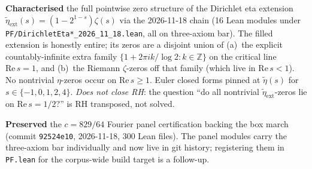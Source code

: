 
\item \textbf{Characterised} the full pointwise zero structure of
the Dirichlet eta extension
$\widetilde{\eta}_{\mathrm{ext}}(s) = (1 - 2^{1-s}) \zeta(s)$ via
the 2026-11-18 chain (16 Lean modules under
\texttt{PF/DirichletEta*\_2026\_11\_18.lean}, all on three-axiom
bar).  The filled extension is honestly entire; its zeros are a
disjoint union of (a)~the explicit countably-infinite extra family
$\{1 + 2\pi i k / \log 2 : k \in \mathbb{Z}\}$ on the critical line
$\mathrm{Re}\,s = 1$, and (b)~the Riemann $\zeta$-zeros off that
family (which live in $\mathrm{Re}\,s < 1$).  No nontrivial
$\eta$-zeros occur on $\mathrm{Re}\,s \ge 1$.  Euler closed forms
pinned at $\widetilde{\eta}(s)$ for $s \in \{-1, 0, 1, 2, 4\}$.
\emph{Does not close RH}: the question ``do all nontrivial
$\widetilde{\eta}_{\mathrm{ext}}$-zeros lie on $\mathrm{Re}\,s = 1/2$?''
is RH transposed, not solved.

\item \textbf{Preserved} the $c = 829/64$ Fourier panel certification
backing the box march (commit \texttt{92524e10}, 2026-11-18, 300
Lean files).  The panel modules carry the three-axiom bar
individually and now live in git history; registering them in
\texttt{PF.lean} for the corpus-wide build target is a follow-up.
